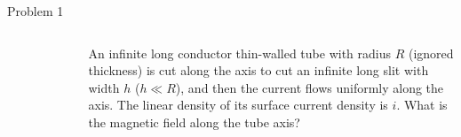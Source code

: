 \documentclass{beamer}
\begin{document}
\begin{frame}{Problem 1}
    
    \begin{columns}
        \begin{column}{0.25\textwidth}
            \begin{figure}[H]
                \centering
                \includegraphics[width=\textwidth]{images/problem1.png}
            \end{figure}
        \end{column}
        \begin{column}{.75\textwidth}
            An infinite long conductor thin-walled tube with radius $R$ (ignored thickness) is cut along the axis to cut an infinite long slit with width $h$ ($h\ll R$), and then the current flows uniformly along the axis. The linear density of its surface current density is $i$. What is the magnetic field along the tube axis?
        \end{column}
    \end{columns}
    

\end{frame}
\end{document}
